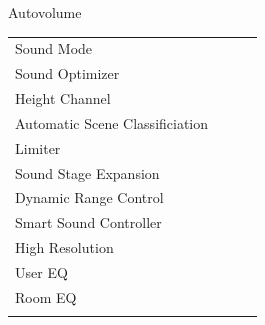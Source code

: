\documentclass{beamer}
\begin{document}
\begin{frame}[t]{Autovolume}
\begin{tiny}
\begin{tabular}{@{}lccc@{}}
				Sound Mode & \color{black}{Off} & & \\
				Sound Optimizer & \color{black}{Off} & & \\
				Height Channel & \color{black}{Off} & & \\
				Automatic Scene Classificiation & \color{black}{Off} & & \\
				Limiter & \color{black}{Off} & & \\
				Sound Stage Expansion & \color{black}{Off} & & \\
				Dynamic Range Control & \color{black}{Off} & & \\
				Smart Sound Controller & \color{black}{Off} & & \\
				High Resolution & \color{black}{Off} & & \\
				User EQ & \color{black}{Off} & & \\
				Room EQ & \color{black}{Off} & & \\
				\color{blue}{OSD Volume} & \color{blue}{On} &  \color{blue}{Vol.40} & \\
				\midrule
			\end{tabular}
		\end{tiny}
		
	\end{frame}
	
\end{document}
